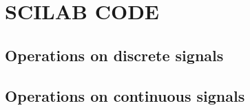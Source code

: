 \section{SCILAB CODE}
\subsection*{Operations on discrete signals}




\subsection*{Operations on continuous signals}

